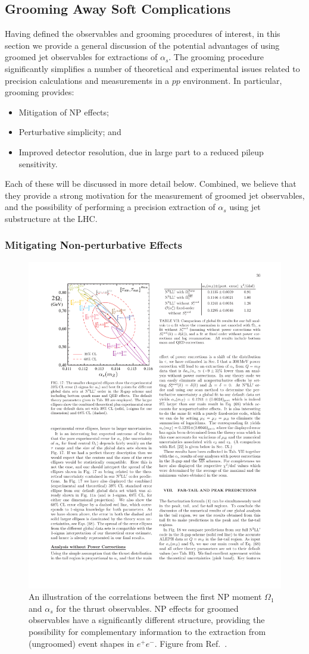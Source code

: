 \documentclass[11pt]{cernrep}
\begin{document}
\subsection{Grooming Away Soft Complications}
\label{jetsub_alphas_sec:softcomplications}

Having defined the observables and grooming procedures of interest, in this section we provide a general discussion of the potential advantages of using groomed jet observables for extractions of $\alpha_s$.
%
The grooming procedure significantly simplifies a number of theoretical and experimental issues related to precision calculations and measurements in a $pp$ environment.
%
In particular, grooming provides:
%
\begin{itemize}
\item Mitigation of NP effects;
\item Perturbative simplicity; and
\item Improved detector resolution, due in large part to a reduced pileup sensitivity.
\end{itemize}
%
Each of these will be discussed in more detail below.
%
Combined, we believe that they provide a strong motivation for the measurement of  groomed jet observables, and the possibility of performing a precision extraction of $\alpha_s$ using jet substructure at the LHC.

\subsubsection{Mitigating Non-perturbative Effects}

\begin{figure}[t]
\begin{center}
\includegraphics[width = 0.5\columnwidth]{jetsub_alphas_correlation_firstmoment.pdf}
\end{center}
\caption{An illustration of the correlations between the first NP moment $\Omega_1$ and $\alpha_s$ for the thrust observables.
%
NP effects for groomed observables have a significantly different structure, providing the possibility for complementary information to the extraction from (ungroomed) event shapes in $e^+e^-$.
%
Figure from Ref.~\cite{Abbate:2010xh}.}
\label{jetsub_alphas_fig:correlation_firstmoment}
\end{figure}
\end{document}
